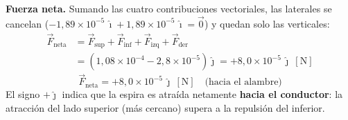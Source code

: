 \documentclass[12pt,letterpaper]{article}
\begin{document}
\medskip
\noindent\textbf{Fuerza neta.} Sumando las cuatro contribuciones vectoriales, las laterales se
cancelan ($-1{,}89\times10^{-5}\,\hat{\imath}+1{,}89\times10^{-5}\,\hat{\imath}=\vec{0}$) y quedan
solo las verticales:
\begin{align*}
    \vec{F}_{\text{neta}} &= \vec{F}_{\text{sup}}+\vec{F}_{\text{inf}}+\vec{F}_{\text{izq}}+\vec{F}_{\text{der}} \\[2pt]
    &= \left(1{,}08\times10^{-4} - 2{,}8\times10^{-5}\right)\hat{\jmath}
    = +8{,}0\times10^{-5}\,\hat{\jmath}\ [\text{N}]
\end{align*}
\[
    \boxed{\vec{F}_{\text{neta}} = +8{,}0\times10^{-5}\,\hat{\jmath}\ [\text{N}]\quad\text{(hacia el alambre)}}
\]
El signo $+\hat{\jmath}$ indica que la espira es atra\'ida netamente \textbf{hacia el conductor}:
la atracci\'on del lado superior (m\'as cercano) supera a la repulsi\'on del inferior.
\end{document}
